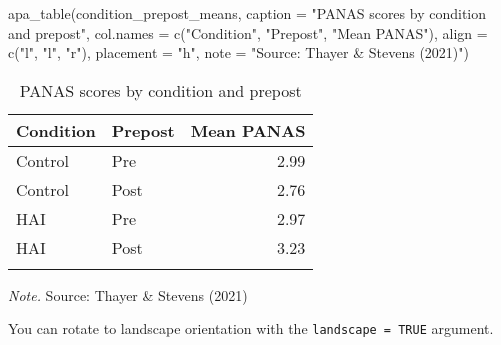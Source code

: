 \documentclass[
  doc]{apa6}
\newenvironment{Shaded}{\begin{snugshade}}{\end{snugshade}}
\newcommand{\AttributeTok}[1]{\textcolor[rgb]{0.77,0.63,0.00}{#1}}
\newcommand{\FunctionTok}[1]{\textcolor[rgb]{0.00,0.00,0.00}{#1}}
\newcommand{\NormalTok}[1]{#1}
\newcommand{\StringTok}[1]{\textcolor[rgb]{0.31,0.60,0.02}{#1}}
\begin{document}
\begin{Shaded}
\begin{Highlighting}[]
\FunctionTok{apa\_table}\NormalTok{(condition\_prepost\_means, }
          \AttributeTok{caption =} \StringTok{"PANAS scores by condition and prepost"}\NormalTok{,}
          \AttributeTok{col.names =} \FunctionTok{c}\NormalTok{(}\StringTok{"Condition"}\NormalTok{, }\StringTok{"Prepost"}\NormalTok{, }\StringTok{"Mean PANAS"}\NormalTok{),}
          \AttributeTok{align =} \FunctionTok{c}\NormalTok{(}\StringTok{"l"}\NormalTok{, }\StringTok{"l"}\NormalTok{, }\StringTok{"r"}\NormalTok{),}
          \AttributeTok{placement =} \StringTok{"h"}\NormalTok{,}
          \AttributeTok{note =} \StringTok{"Source: Thayer \& Stevens (2021)"}\NormalTok{)}
\end{Highlighting}
\end{Shaded}

\begin{table}[h]

\begin{center}
\begin{threeparttable}

\caption{\label{tab:unnamed-chunk-20}PANAS scores by condition and prepost}

\begin{tabular}{llr}
\toprule
Condition & Prepost & Mean PANAS\\
\midrule
Control & Pre & 2.99\\
Control & Post & 2.76\\
HAI & Pre & 2.97\\
HAI & Post & 3.23\\
\bottomrule
\addlinespace
\end{tabular}

\begin{tablenotes}[para]
\normalsize{\textit{Note.} Source: Thayer \& Stevens (2021)}
\end{tablenotes}

\end{threeparttable}
\end{center}

\end{table}

\newpage

You can rotate to landscape orientation with the \texttt{landscape\ =\ TRUE} argument.
\end{document}

